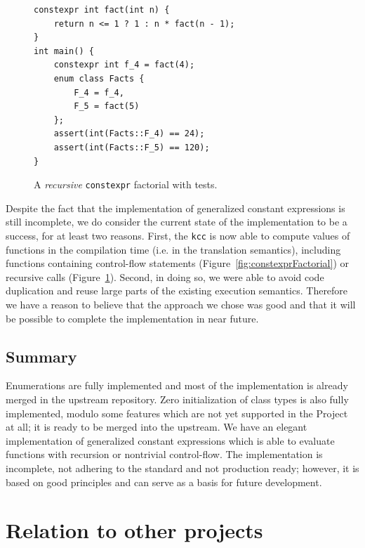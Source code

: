 \documentclass[nolot,nolof,nocover,printed]{fithesis3}
\newcommand{\kcc}{\texttt{kcc}\xspace}
\begin{document}
\begin{figure}[ht]
\begin{lstlisting}
constexpr int fact(int n) {
	return n <= 1 ? 1 : n * fact(n - 1);
}
int main() {
	constexpr int f_4 = fact(4);
	enum class Facts {
		F_4 = f_4,
		F_5 = fact(5)
	};
	assert(int(Facts::F_4) == 24);
	assert(int(Facts::F_5) == 120);
}
\end{lstlisting}
\caption{A \textit{recursive} \texttt{constexpr} factorial with tests.}
\label{fig:recursiveConstexprFactorial}
\end{figure}


Despite the fact that the implementation of generalized constant expressions is still incomplete, we do consider the current state of the implementation to be a success, for at least two reasons. First, the \kcc is now able to compute values of functions in the compilation time (i.e. in the translation semantics), including functions containing control-flow statements (Figure~\ref{fig:constexprFactorial}) or recursive calls (Figure~\ref{fig:recursiveConstexprFactorial}). Second, in doing so, we were able to avoid code duplication and reuse large parts of the existing execution semantics. Therefore we have a reason to believe that the approach we chose was good and that it will be possible to complete the implementation in near future.



\section{Summary}

Enumerations are fully implemented and most of the implementation is already merged in the upstream repository. Zero initialization of class types is also fully implemented, modulo some features which are not yet supported in the Project at all; it is ready to be merged into the upstream. We have an elegant implementation of generalized constant expressions which is able to evaluate functions with recursion or nontrivial control-flow. The implementation is incomplete, not adhering to the standard and not production ready; however, it is based on good principles and can serve as a basis for future development.

\chapter{Relation to other projects}\label{chap:contribToOtherProjects}
\end{document}
